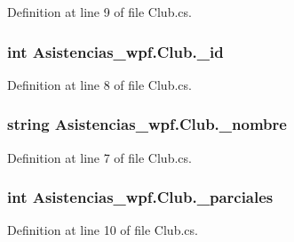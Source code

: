 Definition at line 9 of file Club.\-cs.

\hypertarget{class_asistencias__wpf_1_1_club_a7a5d6696bfce9d5eabd77f0f8df0e0a1}{
\subsubsection[{\-\_\-id}]{\setlength{\rightskip}{0pt plus 5cm}int Asistencias\-\_\-wpf.\-Club.\-\_\-id\hspace{0.3cm}{\ttfamily [private]}}}\label{class_asistencias__wpf_1_1_club_a7a5d6696bfce9d5eabd77f0f8df0e0a1}


Definition at line 8 of file Club.\-cs.

\hypertarget{class_asistencias__wpf_1_1_club_a12f1784ec3bc13922c64b7d19f894fbc}{
\subsubsection[{\-\_\-nombre}]{\setlength{\rightskip}{0pt plus 5cm}string Asistencias\-\_\-wpf.\-Club.\-\_\-nombre\hspace{0.3cm}{\ttfamily [private]}}}\label{class_asistencias__wpf_1_1_club_a12f1784ec3bc13922c64b7d19f894fbc}


Definition at line 7 of file Club.\-cs.

\hypertarget{class_asistencias__wpf_1_1_club_a10d18182664961ad5d6c63fe363abe07}{
\subsubsection[{\-\_\-parciales}]{\setlength{\rightskip}{0pt plus 5cm}int Asistencias\-\_\-wpf.\-Club.\-\_\-parciales\hspace{0.3cm}{\ttfamily [private]}}}\label{class_asistencias__wpf_1_1_club_a10d18182664961ad5d6c63fe363abe07}


Definition at line 10 of file Club.\-cs.



